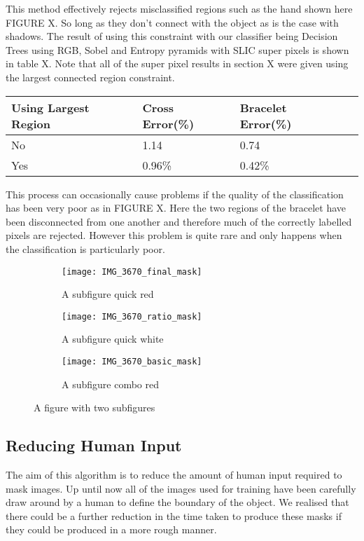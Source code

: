 \documentclass[12pt]{IIBproject}
\begin{document}
This method effectively rejects misclassified regions such as the hand shown here FIGURE X. So long as they don't connect with the object as is the case with shadows. The result of using this constraint with our classifier being Decision Trees using RGB, Sobel and Entropy pyramids with SLIC super pixels is shown in table X. Note that all of the super pixel results in section X were given using the largest connected region constraint.
\begin{center}
    \begin{tabular}{ | l | l | l | p{5cm} |}
    \hline
    Using Largest Region & Cross Error(\%) & Bracelet Error(\%) \\ \hline
    No & 1.14 & 0.74 \\ \hline
    Yes & 0.96\% & 0.42\% \\
    \hline
    
    \end{tabular}
    
\end{center}
This process can occasionally cause problems if the quality of the classification has been very poor as in FIGURE X. Here the two regions of the bracelet have been disconnected from one another and therefore much of the correctly labelled pixels are rejected. However this problem is quite rare and only happens when the classification is particularly poor. 

\begin{figure}[H]
\centering
\begin{subfigure}{.5\textwidth}
  \centering
  \texttt{[image: IMG\_3670\_final\_mask]}
  \caption{A subfigure quick red}
  \label{fig:sub2}
\end{subfigure}
\begin{subfigure}{.5\textwidth}
  \centering
  \texttt{[image: IMG\_3670\_ratio\_mask]}
  \caption{A subfigure quick white}
  \label{fig:sub1}
\end{subfigure}%
\begin{subfigure}{.5\textwidth}
  \centering
  \texttt{[image: IMG\_3670\_basic\_mask]}
  \caption{A subfigure combo red}
  \label{fig:sub2}
\end{subfigure}

\caption{A figure with two subfigures}
\label{fig:test}
\end{figure}

\subsection{Reducing Human Input}
The aim of this algorithm is to reduce the amount of human input required to mask images. Up until now all of the images used for training have been carefully draw around by a human to define the boundary of the object. We realised that there could be a further reduction in the time taken to produce these masks if they could be produced in a more rough manner. 
\end{document}
